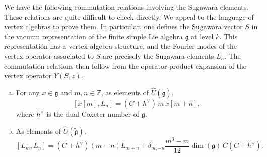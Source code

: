 \documentclass[12pt]{article}
\begin{document}
We have the following commutation relations involving the Sugawara elements. These relations are quite difficult to check directly. We appeal to the language of vertex algebras to prove them. In particular, one defines the Sugawara vector $S$ in the vacuum representation of the finite simple Lie algebra $\mathfrak{g}$ at level $k$. This representation has a vertex algebra structure, and the Fourier modes of the vertex operator associated to $S$ are precisely the Sugawara elements $L_n$. The commutation relations then follow from the operator product expansion of the vertex operator $Y(S,z)$.
\begin{proposition}\label{prop:3.2.2}
    \leavevmode
\begin{enumerate}[(a)]
\item For any $x\in\mathfrak{g}$ and $m,n\in\mathbb{Z}$, as elements of $\widehat{U}(\widetilde{\mathfrak{g}})$,
\[
[x[m],L_n]=(C+h^{\vee})\,m\,x[m+n],
\]
where $h^{\vee}$ is the dual Coxeter number of $\mathfrak{g}$.

\item As elements of $\widehat{U}(\widetilde{\mathfrak{g}})$,
\[
[L_m,L_n]=(C+h^{\vee})(m-n)L_{m+n}
+ \delta_{m,-n}\frac{m^3-m}{12}\dim(\mathfrak{g})\,C(C+h^{\vee}).
\]
\end{enumerate}
\end{proposition}
\end{document}
